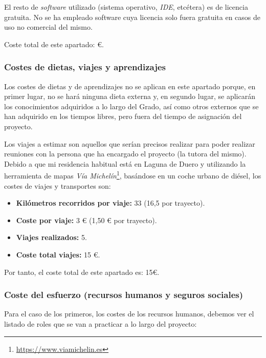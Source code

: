 \documentclass[twoside]{report}
\begin{document}
El resto de \textit{software} utilizado (sistema operativo, \textit{IDE}, etcétera) es de licencia gratuita. No se ha empleado software cuya licencia solo fuera gratuita en casos de uso no comercial del mismo.

Coste total de este apartado:  \euro .

\subsubsection{Costes de dietas, viajes y aprendizajes}

Los costes de dietas y de aprendizajes no se aplican en este apartado porque, en primer lugar, no se hará ninguna dieta externa y, en segundo lugar, se aplicarán los conocimientos adquiridos a lo largo del Grado, así como otros externos que se han adquirido en los tiempos libres, pero fuera del tiempo de asignación del proyecto.

Los viajes a estimar son aquellos que serían precisos realizar para poder realizar reuniones con la persona que ha encargado el proyecto (la tutora del mismo). Debido a que mi residencia habitual está en Laguna de Duero y utilizando la herramienta de mapas \textit{Vía Michelín}\footnote{\url{https://www.viamichelin.es}}, basándose en un coche urbano de diésel, los costes de viajes y transportes son:

\begin{itemize}
\item \textbf{Kilómetros recorridos por viaje:} 33 (16,5 por trayecto).
\item \textbf{Coste por viaje:} 3 \euro \hspace{0.1cm} (1,50 \euro \hspace{0.1cm} por trayecto).
\item \textbf{Viajes realizados:} 5.
\item \textbf{Coste total viajes:} 15 \euro.
\end{itemize}

Por tanto, el coste total de este apartado es: 15\euro.

\subsubsection{Coste del esfuerzo (recursos humanos y seguros sociales)}

Para el caso de los primeros, los costes de los recursos humanos, debemos ver el listado de roles que se van a practicar a lo largo del proyecto:
\end{document}
